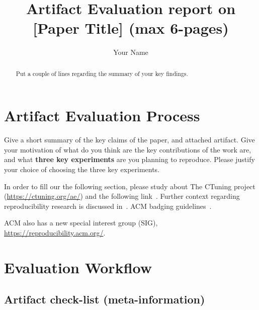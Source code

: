 \documentclass[sigconf,10pt, screen]{acmart}
\begin{document}
\title{Artifact Evaluation report on [Paper Title] (max 6-pages)}
\author{Your Name}
\begin{abstract}
Put a couple of lines regarding the summary of your key findings. 
\end{abstract}

\maketitle

\section{Artifact Evaluation Process}
Give a short summary of the key claims of the paper, and attached artifact. Give your motivation of what do you think are the key contributions of the work are, and what \textbf{three key experiments} are you planning to reproduce. Please justify your choice of choosing the three key experiments. 


In order to fill our the following section, please study about The CTuning project (\url{https://ctuning.org/ae/}) and the following link~\cite{2023-ae-checklist}. Further context regarding reproducibility research is discussed in~\cite{2017-cacm-notes-repro,2020-sigcomm-rev-badging,2023-sigops-ae-notes,2023-sigplan-ae-guidelines}. ACM badging guidelines~\cite{2023-acm-badge}.

ACM also has a new special interest group (SIG), \url{https://reproducibility.acm.org/}.
\section{Evaluation Workflow}

\subsection{Artifact check-list (meta-information)}
\end{document}
